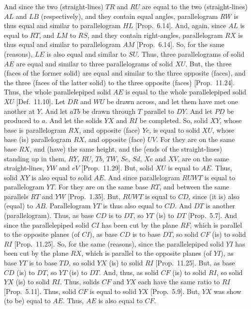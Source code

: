 \begin{Parallel}{}{}
{And since the two (straight-lines) $TR$ and $RU$ are
equal to the two (straight-lines) $AL$ and $LB$ (respectively), and
they contain equal angles, parallelogram $RW$ is thus  equal
and similar to parallelogram $HL$ [Prop.~6.14]. 
And, again, since $AL$ is equal to $RT$, and $LM$ to $RS$, and they contain right-angles, parallelogram $RX$ is thus equal and similar to
parallelogram $AM$ [Prop.~6.14].  So, for the
same (reasons), $LE$ is also equal and similar to $SU$. Thus, three
parallelograms of solid $AE$ are equal and similar to three parallelograms of
 solid $XU$. But, the three (faces of the former solid)
are equal and similar to the three opposite (faces), and the three (faces
of the
latter solid) to the three opposite (faces) [Prop.~11.24]. Thus, the whole
parallelepiped solid $AE$ is equal to the whole parallelepiped solid
$XU$ [Def.~11.10]. Let $DR$ and
$WU$ be drawn across, and let them have met one another at $Y$.
And let $aTb$ be drawn through $T$ parallel to $DY$. And let
$PD$ be produced to $a$. And let the solids $YX$ and $RI$ be 
completed. So,  solid $XY$, whose base is parallelogram $RX$,
and opposite (face) $Yc$,  is equal to  solid $XU$, whose base
(is) parallelogram $RX$, and opposite (face) $UV$. For they are
on the same base $RX$, and (have) the same height,  and the (ends of the straight-lines) standing up in them, $RY$, $RU$, $Tb$, $TW$, $Se$, $Sd$, $Xc$ and $XV$, are on the same straight-lines, $YW$ and $eV$ 
[Prop.~11.29].  But, solid $XU$ is equal to
$AE$. Thus, solid $XY$ is also equal to solid $AE$. And since
parallelogram $RUWT$ is equal to parallelogram $YT$. For they are
on the same base $RT$, and between the same parallels $RT$ and $YW$
[Prop.~1.35]. But, $RUWT$ is equal to
$CD$, since (it is) also (equal) to $AB$. Parallelogram $YT$ is thus also
equal to $CD$. And $DT$ is another (parallelogram). Thus, as base $CD$
is to $DT$, so $YT$ (is) to $DT$ [Prop.~5.7]. 
And since the parallelepiped solid $CI$ has been cut by the plane
$RF$, which is parallel to the opposite planes (of $CI$), as  base $CD$
is to base $DT$, so solid $CF$ (is) to solid $RI$ [Prop.~11.25]. So, for the same (reasons), since the parallelepiped solid
$YI$ has been cut by the plane $RX$, which is parallel to the opposite
planes (of $YI$), as base $YT$ is to base $TD$, so solid $YX$ (is)
 to solid $RI$ [Prop.~11.25]. But, as base $CD$ (is) to $DT$, so $YT$ (is) to $DT$. And, thus, as solid $CF$ (is) to solid $RI$,
so solid $YX$ (is) to solid $RI$. Thus,  solids $CF$ and
$YX$ each have the same ratio to $RI$ [Prop.~5.11]. Thus, solid $CF$
is equal to solid $YX$ [Prop.~5.9]. But,
$YX$ was show (to be) equal to $AE$. Thus, $AE$ is also equal to
$CF$.

}
\end{Parallel}
